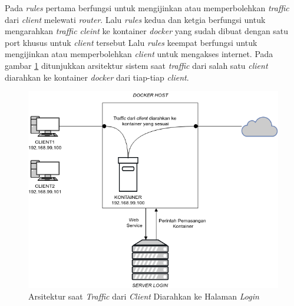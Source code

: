 Pada \textit{rules} pertama berfungsi untuk mengijinkan atau memperbolehkan \textit{traffic} dari \textit{client} melewati \textit{router}. Lalu \textit{rules} kedua dan ketgia berfungsi untuk mengarahkan \textit{traffic cleint} ke kontainer \textit{docker} yang sudah dibuat dengan satu port khusus untuk \textit{client} tersebut Lalu \textit{rules} keempat berfungsi untuk mengijinkan atau memperbolehkan \textit{client} untuk mengakses internet. Pada gambar \ref{diagram3} ditunjukkan arsitektur sistem saat \textit{traffic} dari salah satu \textit{client} diarahkan ke kontainer \textit{docker} dari tiap-tiap \textit{client}.

\begin{figure}[H]
	\centering
	\includegraphics[width=\linewidth]{images/bab4/DIAGRAM3}
	\caption{Arsitektur saat \textit{Traffic} dari \textit{Client} Diarahkan ke Halaman \textit{Login}}
	\label{diagram3}
\end{figure} 